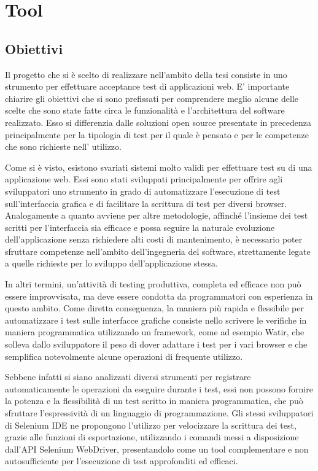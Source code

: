 \chapter{Tool}

\section{Obiettivi}

Il progetto che si è scelto di realizzare nell'ambito della tesi consiste in uno strumento per effettuare acceptance test di applicazioni web. E' importante chiarire gli obiettivi che si sono prefissati per comprendere meglio alcune delle scelte che sono state fatte circa le funzionalità e l'architettura del software realizzato. Esso si differenzia dalle soluzioni open source presentate in precedenza principalmente per la tipologia di test per il quale è pensato e per le competenze che sono richieste nell' utilizzo.

Come si è visto, esistono svariati sistemi molto validi per effettuare test su di una applicazione web. Essi sono stati sviluppati principalmente per offrire agli sviluppatori uno strumento in grado di automatizzare l'esecuzione di test sull'interfaccia grafica e di facilitare la scrittura di test per diversi browser. Analogamente a quanto avviene per altre metodologie, affinché l'insieme dei test scritti per l'interfaccia sia efficace e possa seguire la naturale evoluzione dell'applicazione senza richiedere alti costi di mantenimento, è necessario poter sfruttare competenze nell'ambito dell'ingegneria del software, strettamente legate a quelle richieste per lo sviluppo dell'applicazione stessa. 

In altri termini, un'attività di testing produttiva, completa ed efficace non può essere improvvisata, ma deve essere condotta da programmatori con esperienza in questo ambito. Come diretta conseguenza, la maniera più rapida e flessibile per automatizzare i test sulle interfacce grafiche consiste nello scrivere le verifiche in maniera programmatica utilizzando un framework, come ad esempio Watir, che solleva dallo sviluppatore il peso di dover adattare i test per i vari browser e che semplifica notevolmente alcune operazioni di frequente utilizzo.

Sebbene infatti si siano analizzati diversi strumenti per registrare automaticamente le operazioni da eseguire durante i test, essi non possono fornire la potenza e la flessibilità di un test scritto in maniera programmatica, che può sfruttare l'espressività di un linguaggio di programmazione. Gli stessi sviluppatori di Selenium IDE ne propongono l'utilizzo per velocizzare la scrittura dei test, grazie alle funzioni di esportazione, utilizzando i comandi messi a disposizione dall'API Selenium WebDriver, presentandolo come un tool complementare e non autosufficiente per l'esecuzione di test approfonditi ed efficaci. 

